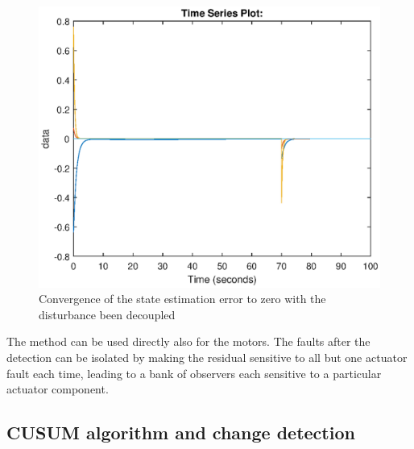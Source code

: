 \begin{figure}[H]
	\centering
	\includegraphics[width=0.7\linewidth]{figures/obstest}
	\caption{Convergence of the state estimation error to zero with the disturbance been decoupled}
	\label{fig:residualobstest}
\end{figure}
The method can be used directly also for the motors. The faults after the detection can be isolated by making the residual sensitive to all but one actuator fault each time, leading to a bank of observers each sensitive to a particular actuator component.
\subsection{CUSUM algorithm and change detection} 